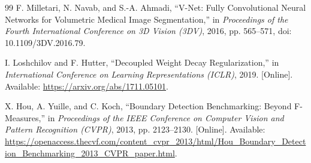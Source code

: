 \documentclass[10pt,a4paper,twocolumn]{article}
\begin{document}
\begin{thebibliography}{99}
F. Milletari, N. Navab, and S.-A. Ahmadi,
``V-Net: Fully Convolutional Neural Networks for Volumetric Medical Image Segmentation,''
in \emph{Proceedings of the Fourth International Conference on 3D Vision (3DV)},
2016, pp. 565--571, doi: 10.1109/3DV.2016.79.

I. Loshchilov and F. Hutter,
``Decoupled Weight Decay Regularization,''
in \emph{International Conference on Learning Representations (ICLR)}, 2019.
[Online]. Available: \url{https://arxiv.org/abs/1711.05101}.

X. Hou, A. Yuille, and C. Koch,
``Boundary Detection Benchmarking: Beyond F-Measures,''
in \emph{Proceedings of the IEEE Conference on Computer Vision and Pattern Recognition (CVPR)},
2013, pp. 2123--2130.
[Online]. Available: \url{https://openaccess.thecvf.com/content_cvpr_2013/html/Hou_Boundary_Detection_Benchmarking_2013_CVPR_paper.html}.

\end{thebibliography}
\end{document}
